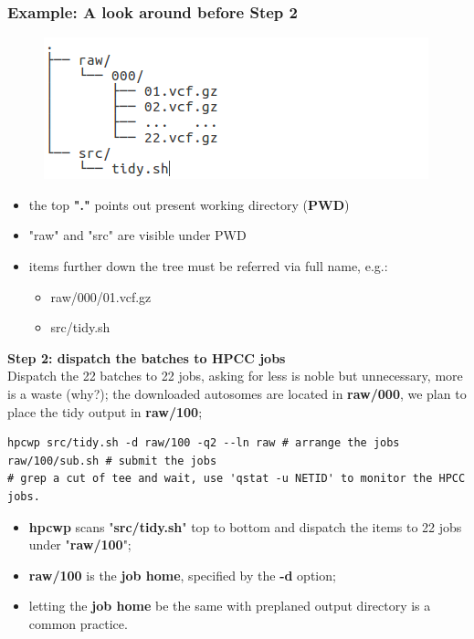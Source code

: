 \documentclass{beamer}
\begin{document}
\begin{frame}[fragile]
\frametitle{Example: A look around before Step 2}
\begin{figure}
\includegraphics[width=0.7\linewidth]{img/step1}
\end{figure}
\begin{itemize}
\item the top \textbf{"."} points out present working directory (\textbf{PWD})
\item "raw" and "src" are visible under PWD
\item items further down the tree must be referred via full name, e.g.:
  \begin{itemize}
  \item raw/000/01.vcf.gz
  \item src/tidy.sh
  \end{itemize}
\end{itemize}

\end{frame}


\begin{frame}[fragile]
\textbf{Step 2: dispatch the batches to HPCC jobs} \\
Dispatch the 22 batches to 22 jobs, asking for less is noble but unnecessary, more is a waste (why?);
the downloaded autosomes are located in \textbf{raw/000}, we plan to place the tidy output in \textbf{raw/100};
\begin{example}
\begin{lstlisting}
hpcwp src/tidy.sh -d raw/100 -q2 --ln raw # arrange the jobs
raw/100/sub.sh # submit the jobs
# grep a cut of tee and wait, use 'qstat -u NETID' to monitor the HPCC jobs.
\end{lstlisting}
\end{example}
\begin{itemize}
\item \textbf{hpcwp} scans "\textbf{src/tidy.sh}" top to bottom and dispatch the items to 22 jobs under "\textbf{raw/100}";
\item \textbf{raw/100} is the \textbf{job home}, specified by the \textbf{-d} option;
\item letting the \textbf{job home} be the same with preplaned output directory is a common practice.
\end{itemize}
\end{frame}
\end{document}
